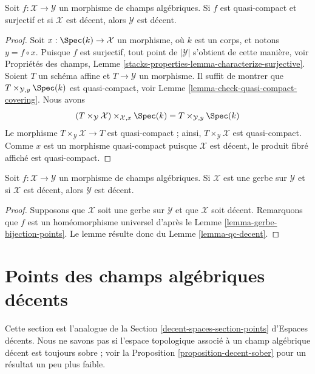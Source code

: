 \begin{lemma}
\label{lemma-qc-decent}
Soit $f : \mathcal{X} \to \mathcal{Y}$ un morphisme de champs algébriques.
Si $f$ est quasi-compact et surjectif et si $\mathcal{X}$ est décent,
alors $\mathcal{Y}$ est décent.
\end{lemma}

\begin{proof}
Soit $x : \Spec(k) \to \mathcal{X}$ un morphisme, où $k$ est un corps,
et notons $y = f \circ x$. Puisque $f$ est surjectif, tout point
de $|\mathcal{Y}|$ s'obtient de cette manière, voir Propriétés des champs,
Lemme \ref{stacks-properties-lemma-characterize-surjective}.
Soient $T$ un schéma affine et $T \to \mathcal{Y}$ un morphisme.
Il suffit de montrer que
$T \times_{\mathcal{Y}, y} \Spec(k)$ est quasi-compact, voir
Lemme \ref{lemma-check-quasi-compact-covering}.
Nous avons
$$
(T \times_{\mathcal{Y}} \mathcal{X}) \times_{\mathcal{X}, x} \Spec(k) =
T \times_{\mathcal{Y}, y} \Spec(k)
$$
Le morphisme $T \times_{\mathcal{Y}} \mathcal{X} \to T$ est quasi-compact ;
ainsi, $T \times_\mathcal{Y} \mathcal{X}$ est quasi-compact. Comme $x$ est
un morphisme quasi-compact puisque $\mathcal{X}$ est décent,
le produit fibré affiché est quasi-compact.
\end{proof}

\begin{lemma}
\label{lemma-gerbe-decent}
Soit $f : \mathcal{X} \to \mathcal{Y}$ un morphisme de champs algébriques.
Si $\mathcal{X}$ est une gerbe sur $\mathcal{Y}$ et si $\mathcal{X}$ est décent,
alors $\mathcal{Y}$ est décent.
\end{lemma}

\begin{proof}
Supposons que $\mathcal{X}$ soit une gerbe sur $\mathcal{Y}$ et que
$\mathcal{X}$ soit décent. Remarquons que $f$ est un homéomorphisme universel
d'après le Lemme \ref{lemma-gerbe-bijection-points}.
Le lemme résulte donc du Lemme \ref{lemma-qc-decent}.
\end{proof}


\section{Points des champs alg\'ebriques d\'ecents}
\label{section-points-decent}

\noindent
Cette section est l'analogue de la Section
\ref{decent-spaces-section-points} d'Espaces d\'ecents.
Nous ne savons pas si l'espace topologique associ\'e
\`a un champ alg\'ebrique d\'ecent est toujours sobre ; voir
la Proposition \ref{proposition-decent-sober} pour un r\'esultat
un peu plus faible.

